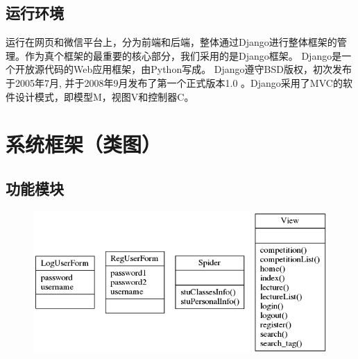 \documentclass[UTF8]{ctexart}
\begin{document}
\begin{spacing}{1.3}
\subsection{运行环境}
运行在网页和微信平台上，分为前端和后端，整体通过Django进行整体框架的管理。作为真个框架的最重要的核心部分，我们采用的是Django框架。 Django是一个开放源代码的Web应用框架，由Python写成。 Django遵守BSD版权，初次发布于2005年7月, 并于2008年9月发布了第一个正式版本1.0 。Django采用了MVC的软件设计模式，即模型M，视图V和控制器C。

\section{系统框架（类图）}

\subsection{功能模块}
		\begin{figure}[H]
				\centering
				\includegraphics[width=\textwidth]{images//classes_view.png}
		\end{figure}


\end{spacing}
\end{document}
